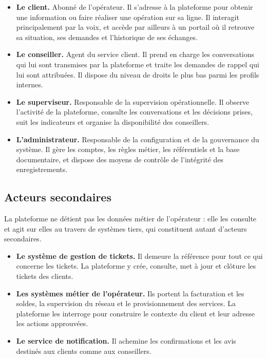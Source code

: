 \begin{itemize}
  \item \textbf{Le client.} Abonné de l'opérateur. Il s'adresse à la plateforme pour obtenir une information ou faire réaliser une opération sur sa ligne. Il interagit principalement par la voix, et accède par ailleurs à un portail où il retrouve sa situation, ses demandes et l'historique de ses échanges.
  \item \textbf{Le conseiller.} Agent du service client. Il prend en charge les conversations qui lui sont transmises par la plateforme et traite les demandes de rappel qui lui sont attribuées. Il dispose du niveau de droits le plus bas parmi les profils internes.
  \item \textbf{Le superviseur.} Responsable de la supervision opérationnelle. Il observe l'activité de la plateforme, consulte les conversations et les décisions prises, suit les indicateurs et organise la disponibilité des conseillers.
  \item \textbf{L'administrateur.} Responsable de la configuration et de la gouvernance du système. Il gère les comptes, les règles métier, les référentiels et la base documentaire, et dispose des moyens de contrôle de l'intégrité des enregistrements.
\end{itemize}

\subsection{Acteurs secondaires}

La plateforme ne détient pas les données métier de l'opérateur : elle les consulte et agit sur elles au travers de systèmes tiers, qui constituent autant d'acteurs secondaires.

\begin{itemize}
  \item \textbf{Le système de gestion de tickets.} Il demeure la référence pour tout ce qui concerne les tickets. La plateforme y crée, consulte, met à jour et clôture les tickets des clients.
  \item \textbf{Les systèmes métier de l'opérateur.} Ils portent la facturation et les soldes, la supervision du réseau et le provisionnement des services. La plateforme les interroge pour construire le contexte du client et leur adresse les actions approuvées.
  \item \textbf{Le service de notification.} Il achemine les confirmations et les avis destinés aux clients comme aux conseillers.
\end{itemize}


